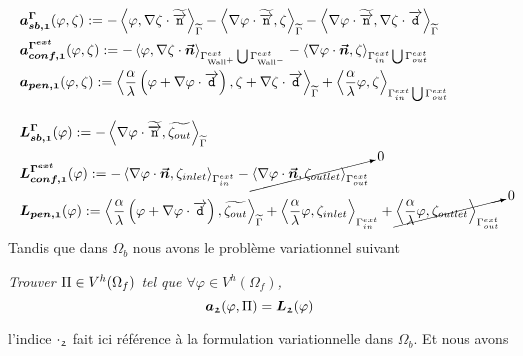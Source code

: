 \begin{subequations}
	\begin{align}
		&\boldsymbol{a_{sb,\mathfrak{1}}^{\Gamma} } (\varphi, \zeta) := -\left<\varphi,\nabla \zeta \cdot \widetilde{\overrightarrow{\boldsymbol{\mathtt{n}}}}\right>_{\widetilde{\Gamma}} - \left<\nabla \varphi \cdot \widetilde{\overrightarrow{\boldsymbol{\mathtt{n}}}},\zeta\right>_{\widetilde{\Gamma}} - \left<\nabla \varphi \cdot \widetilde{\overrightarrow{\boldsymbol{\mathtt{n}}}},\nabla \zeta \cdot \overrightarrow{\boldsymbol{\mathtt{d}}}\right>_{\widetilde{\Gamma}}\label{eq:a_sb_1}\\
		&\boldsymbol{a_{conf, \mathfrak{1}}^{\Gamma^{ext}}} (\varphi, \zeta) := -\left<\varphi,\nabla \zeta \cdot \boldsymbol{\vec{n}}\right>_{\Gamma^{ext}_{\text{Wall}^{+}} \bigcup \Gamma^{ext}_{\text{Wall}^{-}}}  - \left<\nabla \varphi \cdot \boldsymbol{\vec{n}},\zeta\right>_{\Gamma^{ext}_{in}\bigcup\Gamma^{ext}_{out}}\label{eq:a_conf_1}\\
		&\boldsymbol{a_{pen, \mathfrak{1}}} (\varphi, \zeta) := \left<\frac{\alpha}{\lambda} \left(\varphi + \nabla \varphi \cdot \overrightarrow{\boldsymbol{\mathtt{d}}}\right),\zeta + \nabla \zeta \cdot \overrightarrow{\boldsymbol{\mathtt{d}}}\right>_{\widetilde{\Gamma}} + \left<\frac{\alpha}{\lambda}\varphi,\zeta\right>_{\Gamma^{ext}_{in}\bigcup\Gamma^{ext}_{out}}\label{eq:a_pen_1}\\[1em]
		&\boldsymbol{L_{sb, \mathfrak{1}}^{\Gamma}}(\varphi) := -\left<\nabla \varphi \cdot \widetilde{\overrightarrow{\boldsymbol{\mathtt{n}}}},\widetilde{\zeta_{out}}\right>_{\widetilde{\Gamma}}\label{eq:L_sb_1}\\
		&\boldsymbol{L_{conf, \mathfrak{1}}^{\Gamma^{ext}}} (\varphi) := - \left<\nabla \varphi\cdot \boldsymbol{\vec{n}},\zeta_{inlet}\right>_{\Gamma_{in}^{ext}} - \cancelto{0}{\left<\nabla \varphi\cdot \boldsymbol{\vec{n}},\zeta_{outlet}\right>_{\Gamma_{out}^{ext}}}\label{eq:L_conf_1}\\
		&\boldsymbol{L_{pen, \mathfrak{1}}} (\varphi) :=  \left<\frac{\alpha}{\lambda} \left(\varphi + \nabla \varphi \cdot \overrightarrow{\boldsymbol{\mathtt{d}}}\right), \widetilde{\zeta_{out}}\right>_{\widetilde{\Gamma}} + \left<\frac{\alpha}{\lambda}\varphi,\zeta_{inlet}\right>_{\Gamma^{ext}_{in}} + \cancelto{0}{\left<\frac{\alpha}{\lambda}\varphi,\zeta_{outlet}\right>_{\Gamma^{ext}_{out}}}\label{eq:L_pen_1}
	\end{align}
\end{subequations}
\vspace{5mm}
\noindent Tandis que dans $\Omega_b$ nous avons le problème variationnel suivant
\begin{refe}
	\noindent \textit{Trouver $\Pi\in V^h (\Omega_f)$ tel que $\forall \varphi \in V^h (\Omega_f)$,}
	\begin{equation}
	\boldsymbol{a_{\mathfrak{2}}}(\varphi, \Pi) = \boldsymbol{L_{\mathfrak{2}}}(\varphi)
	\end{equation}
\end{refe}
l'indice $\cdot_{\mathfrak{2}}$ fait ici référence à la formulation variationnelle dans $\Omega_b$. Et nous avons
